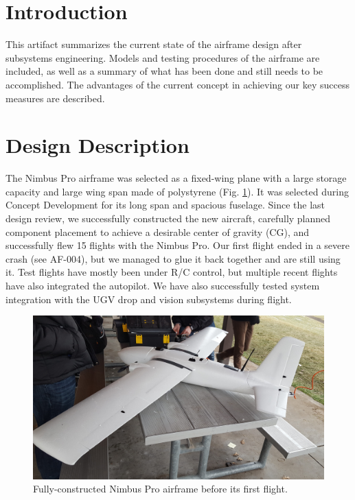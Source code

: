 \documentclass[]{auvsi_doc}
\begin{document}
\begin{AUVSITitlePage}
\begin{artifacttable}
\end{artifacttable}
\end{AUVSITitlePage}

\section{Introduction}
This artifact summarizes the current state of the airframe design after subsystems engineering. Models and testing procedures of the airframe are included, as well as a summary of what has been done and still needs to be accomplished. The advantages of the current concept in achieving our key success measures are described.

\section{Design Description}
The Nimbus Pro airframe was selected as a fixed-wing plane with a large storage capacity and large wing span made of polystyrene (Fig. \ref{fig:plane1}). It was selected during Concept Development for its long span and spacious fuselage. Since the last design review, we successfully constructed the new aircraft, carefully planned component placement to achieve a desirable center of gravity (CG), and successfully flew 15 flights with the Nimbus Pro. Our first flight ended in a severe crash (see AF-004), but we managed to glue it back together and are still using it. Test flights have mostly been under R/C control, but multiple recent flights have also integrated the autopilot. We have also successfully tested system integration with the UGV drop and vision subsystems during flight.

\begin{figure}[h!]
	\centering
	\includegraphics[width=.9\columnwidth]{figs/plane1}
	\caption{Fully-constructed Nimbus Pro airframe before its first flight.}
	\label{fig:plane1}
\end{figure}
\end{document}
